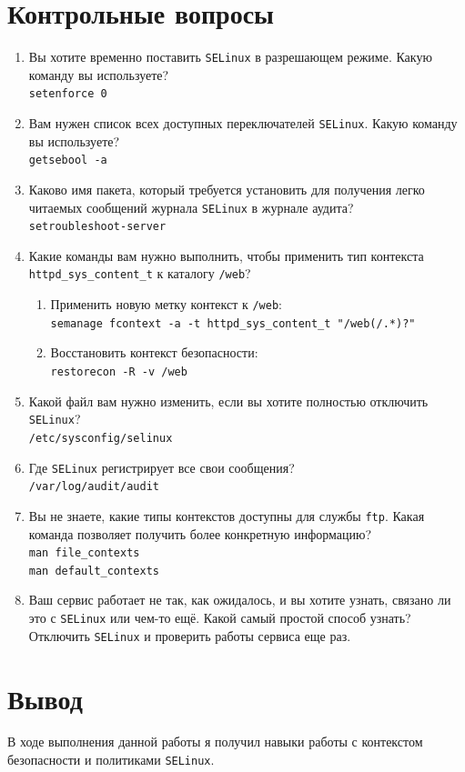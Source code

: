 \documentclass[12pt]{article}
\begin{document}
\section{Контрольные вопросы}
\begin{enumerate}
	\item Вы хотите временно поставить \texttt{SELinux} в разрешающем режиме. Какую команду вы используете? \\
	      \texttt{setenforce 0}
	\item Вам нужен список всех доступных переключателей \texttt{SELinux}. Какую команду вы используете? \\
	      \texttt{getsebool -a}
	\item Каково имя пакета, который требуется установить для получения легко читаемых сообщений журнала \texttt{SELinux} в журнале аудита? \\
	      \texttt{setroubleshoot-server}
	\item Какие команды вам нужно выполнить, чтобы применить тип контекста \texttt{httpd\_sys\_content\_t} к каталогу \texttt{/web}? \\
	      \begin{enumerate}
		      \item Применить новую метку контекст к \texttt{/web}: \\
		            \texttt{semanage fcontext -a -t httpd_sys_content_t "/web(/.*)?"}
		      \item Восстановить контекст безопасности: \\
		            \texttt{restorecon -R -v /web}
	      \end{enumerate}
	\item Какой файл вам нужно изменить, если вы хотите полностью отключить \texttt{SELinux}? \\
	      \texttt{/etc/sysconfig/selinux}
	\item Где \texttt{SELinux} регистрирует все свои сообщения? \\
	      \texttt{/var/log/audit/audit}
	\item Вы не знаете, какие типы контекстов доступны для службы \texttt{ftp}. Какая команда позволяет получить более конкретную информацию? \\
	      \texttt{man file_contexts} \\
	      \texttt{man default_contexts}
	\item Ваш сервис работает не так, как ожидалось, и вы хотите узнать, связано ли это с \texttt{SELinux} или чем-то ещё. Какой самый простой способ узнать? \\
	      Отключить \texttt{SELinux} и проверить работы сервиса еще раз.
\end{enumerate}

\section{Вывод}
В ходе выполнения данной работы я получил навыки работы с контекстом безопасности и политиками \texttt{SELinux}.
\end{document}
